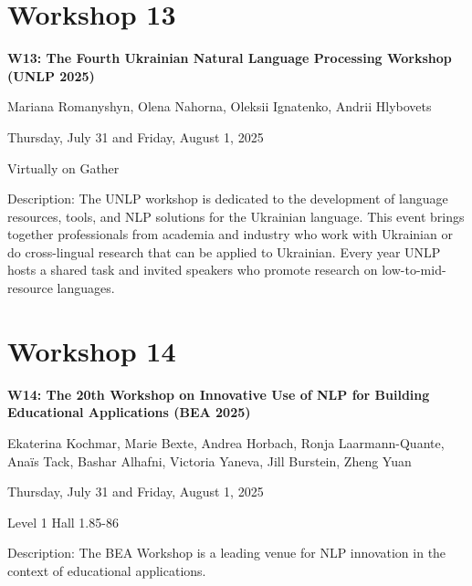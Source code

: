 \clearpage



\section[W13: The Fourth Ukrainian Natural Language Processing Workshop (UNLP 2025)]{Workshop 13}

\begin{center}
    {\Large \textbf{W13: The Fourth Ukrainian Natural Language Processing Workshop (UNLP 2025)}}

    Mariana Romanyshyn, Olena Nahorna, Oleksii Ignatenko, Andrii Hlybovets
    
    Thursday, July 31 and Friday, August 1, 2025
    
    Virtually on Gather

\end{center}

Description: The UNLP workshop is dedicated to the development of language resources, tools, and NLP solutions for the Ukrainian language. This event brings together professionals from academia and industry who work with Ukrainian or do cross-lingual research that can be applied to Ukrainian. Every year UNLP hosts a shared task and invited speakers who promote research on low-to-mid-resource languages.

\clearpage



\section[W14: The 20th Workshop on Innovative Use of NLP for Building Educational Applications (BEA 2025)]{Workshop 14}

\begin{center}
    {\Large \textbf{W14: The 20th Workshop on Innovative Use of NLP for Building Educational Applications (BEA 2025)}}

    Ekaterina Kochmar, Marie Bexte, Andrea Horbach, Ronja Laarmann-Quante, Anaïs Tack, Bashar Alhafni, Victoria Yaneva, Jill Burstein, Zheng Yuan
    
    Thursday, July 31 and Friday, August 1, 2025
    
    Level 1 Hall 1.85-86

\end{center}

Description: The BEA Workshop is a leading venue for NLP innovation in the context of educational applications.

